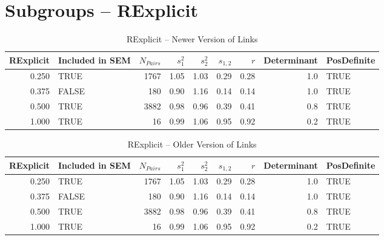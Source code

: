 \documentclass{article}\usepackage{graphicx, color}
\begin{document}
\section{Subgroups --  RExplicit }%
\begin{table}[ht]
\begin{center}
\begin{tabular}{rlrrrrrrl}
  \hline
RExplicit & Included in SEM & $N_{Pairs}$ & $s_1^2$ & $s_2^2$ & $s_{1,2}$ & $r$ & Determinant & PosDefinite \\ 
  \hline
0.250 & TRUE & 1767 & 1.05 & 1.03 & 0.29 & 0.28 & 1.0 & TRUE \\ 
  0.375 & FALSE & 180 & 0.90 & 1.16 & 0.14 & 0.14 & 1.0 & TRUE \\ 
  0.500 & TRUE & 3882 & 0.98 & 0.96 & 0.39 & 0.41 & 0.8 & TRUE \\ 
  1.000 & TRUE & 16 & 0.99 & 1.06 & 0.95 & 0.92 & 0.2 & TRUE \\ 
   \hline
\end{tabular}
\caption{RExplicit -- Newer Version of Links}
\end{center}
\end{table}
\begin{table}[ht]
\begin{center}
\begin{tabular}{rlrrrrrrl}
  \hline
RExplicit & Included in SEM & $N_{Pairs}$ & $s_1^2$ & $s_2^2$ & $s_{1,2}$ & $r$ & Determinant & PosDefinite \\ 
  \hline
0.250 & TRUE & 1767 & 1.05 & 1.03 & 0.29 & 0.28 & 1.0 & TRUE \\ 
  0.375 & FALSE & 180 & 0.90 & 1.16 & 0.14 & 0.14 & 1.0 & TRUE \\ 
  0.500 & TRUE & 3882 & 0.98 & 0.96 & 0.39 & 0.41 & 0.8 & TRUE \\ 
  1.000 & TRUE & 16 & 0.99 & 1.06 & 0.95 & 0.92 & 0.2 & TRUE \\ 
   \hline
\end{tabular}
\caption{RExplicit -- Older Version of Links}
\end{center}
\end{table}
\newpage 
\end{document}

